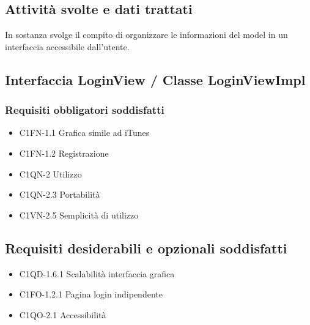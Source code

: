 \subsection*{Attivit\`a svolte e dati trattati}
In sostanza svolge il compito di organizzare le informazioni del model in un
interfaccia accessibile dall'utente.


\subsection{Interfaccia LoginView / Classe LoginViewImpl}
\subsubsection*{Requisiti obbligatori soddisfatti}
\begin{itemize}
    \item C1FN-1.1 Grafica simile ad iTunes
	\item C1FN-1.2 Registrazione
	\item C1QN-2 Utilizzo
	\item C1QN-2.3 Portabilit\`a
	\item C1VN-2.5 Semplicit\`a di utilizzo
\end{itemize}
\subsection*{Requisiti desiderabili e opzionali soddisfatti}
\begin{itemize}
    \item C1QD-1.6.1 Scalabilit\`a interfaccia grafica
    \item C1FO-1.2.1 Pagina login indipendente
    \item C1QO-2.1 Accessibilit\`a
\end{itemize}
